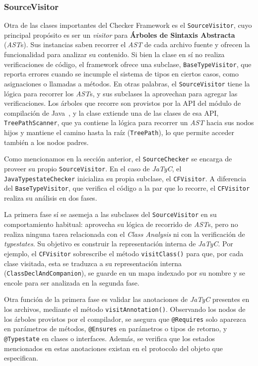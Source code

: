 \subsubsection{SourceVisitor}

Otra de las clases importantes del Checker Framework es el \texttt{SourceVisitor}, cuyo principal propósito es ser un \textit{visitor} para \textbf{Árboles de Sintaxis Abstracta} (\textit{AST}s). Sus instancias saben recorrer el \textit{AST} de cada archivo fuente y ofrecen la funcionalidad para analizar su contenido. Si bien la clase en sí no realiza verificaciones de código, el framework ofrece una subclase, \texttt{BaseTypeVisitor}, que reporta errores cuando se incumple el sistema de tipos en ciertos casos, como asignaciones o llamadas a métodos. En otras palabras, el \texttt{SourceVisitor} tiene la lógica para recorrer los \textit{AST}s, y sus subclases la aprovechan para agregar las verificaciones. Los árboles que recorre son provistos por la API del módulo de compilación de Java~\cite{java-docs:javac-module}, y la clase extiende una de las clases de esa API, \texttt{TreePathScanner}, que ya contiene la lógica para recorrer un \textit{AST} hacia sus nodos hijos y mantiene el camino hasta la raíz (\texttt{TreePath}), lo que permite acceder también a los nodos padres.

Como mencionamos en la sección anterior, el \texttt{SourceChecker} se encarga de proveer su propio \texttt{SourceVisitor}. En el caso de \textit{JaTyC}, el \texttt{JavaTypestateChecker} inicializa su propia subclase, el \texttt{CFVisitor}. A diferencia del \texttt{BaseTypeVisitor}, que verifica el código a la par que lo recorre, el \texttt{CFVisitor} realiza su análisis en dos fases.

La primera fase sí se asemeja a las subclases del \texttt{SourceVisitor} en su comportamiento habitual: aprovecha su lógica de recorrido de \textit{AST}s, pero no realiza ninguna tarea relacionada con el \textit{Class Analysis} ni con la verificación de \textit{typestates}. Su objetivo es construir la representación interna de \textit{JaTyC}. Por ejemplo, el \texttt{CFVisitor} sobrescribe el método \texttt{visitClass()} para que, por cada clase visitada, esta se traduzca a su representación interna (\texttt{ClassDeclAndCompanion}), se guarde en un mapa indexado por su nombre y se encole para ser analizada en la segunda fase.

Otra función de la primera fase es validar las anotaciones de \textit{JaTyC} presentes en los archivos, mediante el método \texttt{visitAnnotation()}. Observando los nodos de los árboles provistos por el compilador, se asegura que \texttt{@Requires} solo aparezca en parámetros de métodos, \texttt{@Ensures} en parámetros o tipos de retorno, y \texttt{@Typestate} en clases o interfaces. Además, se verifica que los estados mencionados en estas anotaciones existan en el protocolo del objeto que especifican.

